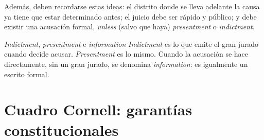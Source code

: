 \documentclass[12pt,oneside]{book}
\begin{document}
Además, deben recordarse estas ideas: el distrito donde se lleva adelante la causa ya tiene que estar determinado antes; el juicio debe ser rápido y público; y debe existir una acusación formal, \textit{unless} (salvo que haya) \textit{presentment} o \textit{indictment}.

\begin{definition}{\textit{Indictment}, \textit{presentment} e \textit{information}}
\textit{Indictment} es lo que emite el gran jurado cuando decide acusar. \textit{Presentment} es lo mismo. Cuando la acusación se hace directamente, sin un gran jurado, se denomina \textit{information}: es igualmente un escrito formal.
\end{definition}

\section{Cuadro Cornell: garantías constitucionales}
\end{document}
